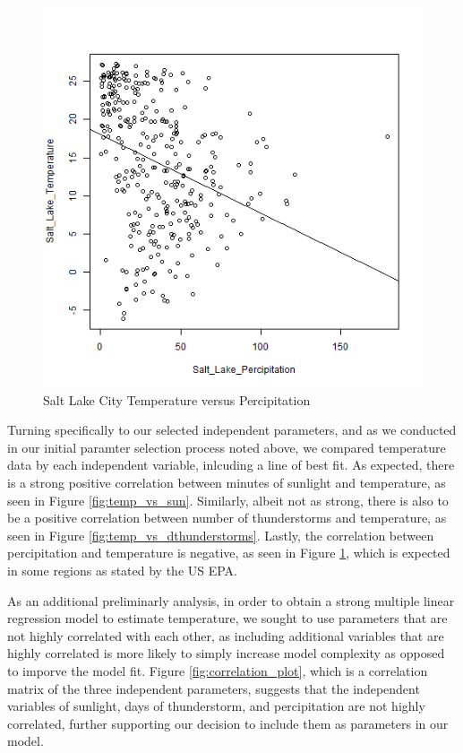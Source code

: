 \begin{figure}
  \centering
  \includegraphics[width=15cm]{../data/img/Temp_vs_Percipitation.PNG}
  \caption{Salt Lake City Temperature versus Percipitation}
  \label{fig:temp_vs_percipitation}
\end{figure}

Turning specifically to our selected independent parameters, and as we conducted in our initial paramter selection process noted above, we compared temperature data by each independent variable, inlcuding a line of best fit. As expected, there is a strong positive correlation between minutes of sunlight and temperature, as seen in Figure \ref{fig:temp_vs_sun}. Similarly, albeit not as strong, there is also to be a positive correlation between number of thunderstorms and temperature, as seen in Figure \ref{fig:temp_vs_dthunderstorms}. Lastly, the correlation between percipitation and temperature is negative, as seen in Figure \ref{fig:temp_vs_percipitation}, which is expected in some regions as stated by the US EPA\cite{epa_utah}.

As an additional preliminarly analysis, in order to obtain a strong multiple linear regression model to estimate temperature, we sought to use parameters that are not highly correlated with each other, as including additional variables that are highly correlated is more likely to simply increase model complexity as opposed to imporve the model fit. Figure \ref{fig:correlation_plot}, which is a correlation matrix of the three independent parameters, suggests that the independent variables of sunlight, days of thunderstorm, and percipitation are not highly correlated, further supporting our decision to include them as parameters in our model.


